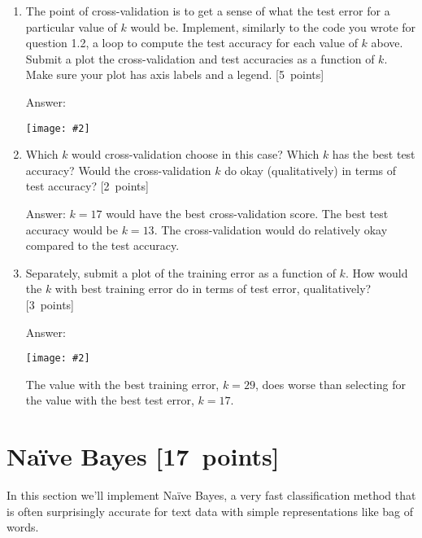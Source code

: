 \documentclass{article}
\newcommand{\blu}[1]{{\textcolor{blu}{#1}}}
\newenvironment{answer}{\par\begingroup\color{gre}Answer: }{\endgroup}
\let\ask\blu
\newcommand\pts[1]{\textcolor{pointscolour}{[#1~points]}}
\newcommand{\centerfig}[2]{\begin{center}\texttt{[image: \#2]}\end{center}}
\begin{document}
\begin{enumerate}
\begin{answer}
\begin{verbatim}
            model = KNN(k)
            model.fit(cross_train, cross_y_train)

            y_pred = model.predict(cross_test)
            err_test = np.mean(y_pred != cross_y_test)

            print(f"k={i} fold={fold}          Testing error: {err_test:.3f}")

            cv_accs += err_test
        cv_accs /= 10
        \end{verbatim}
        \end{answer}
        \item The point of cross-validation is to get a sense of what the test error for a particular value of $k$ would be. Implement, similarly to the code you wrote for question 1.2, a loop to compute the test accuracy for each value of $k$ above. \ask{Submit a plot the cross-validation and test accuracies as a function of $k$.} Make sure your plot has axis labels and a legend. \pts{5}
        \begin{answer}
        \centerfig{.5}{figs/k2_graph.png}
        \end{answer}
        \item Which $k$ would cross-validation choose in this case? Which $k$ has the best test accuracy? Would the cross-validation $k$ do okay (qualitatively) in terms of test accuracy? \pts{2}
        \begin{answer}
        $k = 17$ would have the best cross-validation score. The best test accuracy would be $k = 13$. The cross-validation would do relatively okay compared to the test accuracy.
        \end{answer}
        \item Separately, \ask{submit a plot of the training error as a function of $k$. How would the $k$ with best training error do in terms of test error, qualitatively?} \pts{3}
        \begin{answer}
        \centerfig{.5}{figs/k2_error_graph.png}
        The value with the best training error, $k = 29$, does worse than selecting for the value with the best test error, $k = 17$.
        \end{answer}
    \end{enumerate}


    \clearpage
    \section{Na\"ive Bayes \pts{17}}

    In this section we'll implement Na\"ive Bayes, a very fast classification method that is often surprisingly accurate for text data with simple representations like bag of words.
\end{document}
